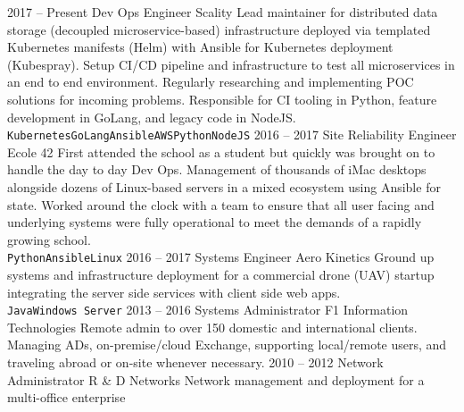 \documentclass[10pt]{developercv} %
\begin{document}
\begin{entrylist}
	\entry
		{2017 -- Present}
		{\Large Dev Ops Engineer}
		{\large Scality}
		{\small Lead maintainer for distributed data storage (decoupled microservice-based) infrastructure
		deployed via templated Kubernetes manifests (Helm) with Ansible for Kubernetes deployment (Kubespray).
		Setup CI/CD pipeline and infrastructure to test all microservices in an end to end environment. Regularly
		researching and implementing POC solutions for incoming problems. Responsible for CI tooling in Python,
		feature development in GoLang, and legacy code in NodeJS.\\
		\texttt{Kubernetes}\slashsep\texttt{GoLang}\slashsep\texttt{Ansible}\slashsep\texttt{AWS}\slashsep\texttt{Python}\slashsep\texttt{NodeJS}}
	\entry
		{2016 -- 2017}
		{\Large Site Reliability Engineer}
		{\large Ecole 42}
		{\small First attended the school as a student but quickly was brought on to handle the day to day Dev Ops. Management of thousands of iMac desktops alongside dozens
		of Linux-based servers in a mixed ecosystem using Ansible for state. Worked around the clock with a team to ensure that all user facing and underlying systems were fully operational to meet the demands of
		a rapidly growing school. \\
		\texttt{Python}\slashsep\texttt{Ansible}\slashsep\texttt{Linux}}
	\entry
		{2016 -- 2017}
		{\Large Systems Engineer}
		{\large Aero Kinetics}
		{\small Ground up systems and infrastructure deployment for a commercial drone (UAV) startup integrating the server side services with client side web apps.\\\texttt{Java}\slashsep\texttt{Windows Server}}
	\entry
		{2013 -- 2016}
		{\Large Systems Administrator}
		{\large F1 Information Technologies}
		{\small Remote admin to over 150 domestic and international clients. Managing ADs, on-premise/cloud Exchange, supporting local/remote users, and traveling abroad or on-site whenever necessary.}
	\entry
		{2010 -- 2012}
		{\Large Network Administrator}
		{\large R \& D Networks}
		{\small Network management and deployment for a multi-office enterprise}

\end{entrylist}


\end{document}
